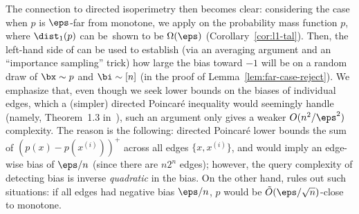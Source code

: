 The connection to directed isoperimetry then becomes clear:
considering the case when $p$ is \mbox{$\eps$-far} from monotone, we apply  on the probability mass function $p$, where $\dist_1(p)$ can be~shown to be $\Omega(\eps)$ (Corollary~\ref{cor:l1-tal}). Then, the left-hand side of  can be used to establish (via an averaging argument and an ``importance sampling'' trick) how large the bias toward $-1$ will be on a random draw of $\bx \sim p$ and $\bi \sim [n]$ (in the proof of Lemma~\ref{lem:far-case-reject}). We emphasize that, even though we seek lower bounds on the biases of individual edges, which a (simpler) directed Poincar\'{e} inequality would seemingly handle (namely, Theorem~1.3 in~\cite{F23}), such an argument only gives a weaker $O(n^2/\eps^2)$ complexity. The reason is the following: directed Poincar\'{e} lower bounds the sum of $(p(x) - p(x^{(i)}))^+$ across all edges $\{x, x^{(i)}\}$, and would imply an edge-wise bias of $\eps / n$ (since there are $n 2^n$ edges); however, the query complexity of detecting bias is inverse {\em quadratic} in the bias. On the other hand,  rules out such situations: if all edges had negative bias $\eps / n$, $p$ would be $\tilde{O}(\eps / \sqrt{n})$-close to monotone. 


